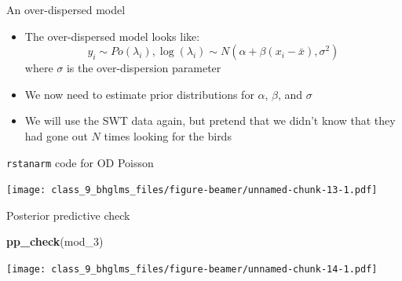 \documentclass[ignorenonframetext,]{beamer}
\newenvironment{Shaded}{\begin{snugshade}}{\end{snugshade}}
\newcommand{\KeywordTok}[1]{\textcolor[rgb]{0.13,0.29,0.53}{\textbf{#1}}}
\newcommand{\DataTypeTok}[1]{\textcolor[rgb]{0.13,0.29,0.53}{#1}}
\newcommand{\DecValTok}[1]{\textcolor[rgb]{0.00,0.00,0.81}{#1}}
\newcommand{\StringTok}[1]{\textcolor[rgb]{0.31,0.60,0.02}{#1}}
\newcommand{\OperatorTok}[1]{\textcolor[rgb]{0.81,0.36,0.00}{\textbf{#1}}}
\newcommand{\NormalTok}[1]{#1}
\begin{document}
\begin{frame}{An over-dispersed model}

\begin{itemize}
\item
  The over-dispersed model looks like:
  \[y_i \sim Po(\lambda_i), \log(\lambda_i) \sim N(\alpha + \beta (x_i - \bar{x}), \sigma^2)\]
  where \(\sigma\) is the over-dispersion parameter
\item
  We now need to estimate prior distributions for \(\alpha\), \(\beta\),
  and \(\sigma\)
\item
  We will use the SWT data again, but pretend that we didn't know that
  they had gone out \(N\) times looking for the birds
\end{itemize}

\end{frame}

\begin{frame}[fragile]{\texttt{rstanarm} code for OD Poisson}

\begin{Shaded}
\end{Shaded}

\texttt{[image: class\_9\_bhglms\_files/figure-beamer/unnamed-chunk-13-1.pdf]}

\end{frame}

\begin{frame}[fragile]{Posterior predictive check}

\begin{Shaded}
\begin{Highlighting}[]
\KeywordTok{pp_check}\NormalTok{(mod_}\DecValTok{3}\NormalTok{)}
\end{Highlighting}
\end{Shaded}

\texttt{[image: class\_9\_bhglms\_files/figure-beamer/unnamed-chunk-14-1.pdf]}

\end{frame}
\end{document}

